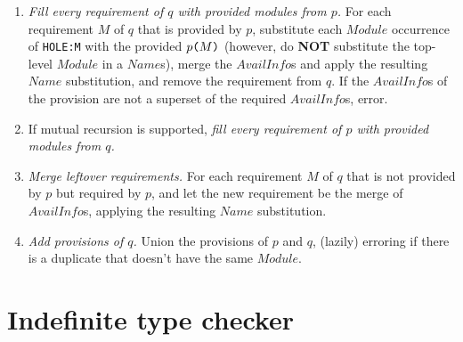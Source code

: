 \documentclass{article}
\newcommand{\I}[1]{\ensuremath{\mathit{#1}}}
\begin{document}
\begin{enumerate}
    \item \emph{Fill every requirement of $q$ with provided modules from
        $p$.} For each requirement $M$ of $q$ that is provided by $p$,
        substitute each \I{Module} occurrence of \verb|HOLE:M| with the
        provided $p\verb|(|M\verb|)|$ (however, do \textbf{NOT} substitute the
        top-level \I{Module} in a \I{Name}s), merge the \I{AvailInfo}s and apply
        the resulting \I{Name} substitution, and
        remove the requirement from $q$.  If the \I{AvailInfo}s of the
        provision are not a superset of the required \I{AvailInfo}s,
        error.
    \item If mutual recursion is supported, \emph{fill every requirement
        of $p$ with provided modules from $q$.}
    \item \emph{Merge leftover requirements.}  For each requirement $M$
        of $q$ that is not provided by $p$ but required by $p$, and let
        the new requirement be the merge of
        \I{AvailInfo}s, applying the resulting \I{Name} substitution.
    \item \emph{Add provisions of $q$.} Union the provisions of $p$ and $q$, (lazily) erroring
        if there is a duplicate that doesn't have the same \I{Module}.
\end{enumerate}

\newpage
\section{Indefinite type checker}
\end{document}
